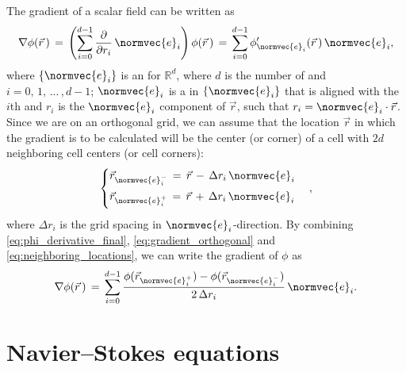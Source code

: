 The gradient of a scalar field can be written as
%
\begin{equation} \label{eq:gradient_orthogonal}
\nabla\phi(\vec{r}\,) \,=\, \left(\sum_{i=0}^{d-1}\frac{\partial}{\partial r_i}\,\normvec{e}_i\right) \phi(\vec{r}\,) \,=\, \sum_{i=0}^{d-1}\phi'_{\normvec{e}_i}(\vec{r}\,)\,\normvec{e}_i,
\end{equation}
%
where $\{\normvec{e}_i\}$ is an  for $\mathbb{R}^d$, where $d$ is the number of \dimensions and $i = 0,\,1,\,...\,,d-1$; $\normvec{e}_i$ is a  in $\{\normvec{e}_i\}$ that is aligned with the $i$th  and $r_i$ is the $\normvec{e}_i$ component of $\vec{r}$,
such that $r_i = \normvec{e}_i\cdot\vec{r}$. Since we are on an orthogonal grid, we can assume that the location $\vec{r}$ in which the gradient is to be calculated will be the center (or corner) of a cell with $2d$ neighboring cell centers (or cell corners):
%
\begin{equation} \label{eq:neighboring_locations}
\begin{cases}
\vec{r}_{\normvec{e}_i^-} \,=\, \vec{r} \,-\, \Delta r_i\,\normvec{e}_i\\[1ex]
\vec{r}_{\normvec{e}_i^+} \,=\, \vec{r} \,+\, \Delta r_i\,\normvec{e}_i\\[1ex]
\end{cases},
\end{equation}
%
where $\Delta r_i$ is the grid spacing in $\normvec{e}_i$-direction. By combining  \ref{eq:phi_derivative_final}, \ref{eq:gradient_orthogonal} and \ref{eq:neighboring_locations}, we can write the gradient of $\phi$ as
%
\begin{equation} \label{eq:gradient_final}
\nabla\phi(\vec{r}\,) \,=\,
\sum_{i=0}^{d-1}\frac{\phi(\vec{r}_{\normvec{e}_i^+})-\phi(\vec{r}_{\normvec{e}_i^-})}{2\,\Delta r_i}\,\normvec{e}_i.
\end{equation}

\section{Navier--Stokes equations}
\label{sec:ns_equations}

